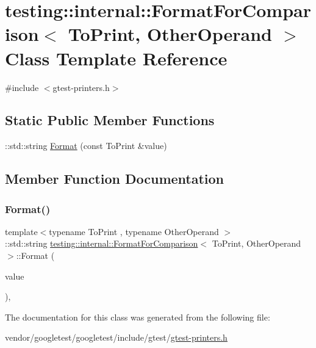 \hypertarget{classtesting_1_1internal_1_1_format_for_comparison}{}\section{testing\+:\+:internal\+:\+:Format\+For\+Comparison$<$ To\+Print, Other\+Operand $>$ Class Template Reference}
\label{classtesting_1_1internal_1_1_format_for_comparison}


{\ttfamily \#include $<$gtest-\/printers.\+h$>$}

\subsection*{Static Public Member Functions}
\begin{DoxyCompactItemize}
\item 
\+::std\+::string \hyperlink{classtesting_1_1internal_1_1_format_for_comparison_a2aeb688fc55b57abd3021d82eccad896}{Format} (const To\+Print \&value)
\end{DoxyCompactItemize}


\subsection{Member Function Documentation}
\mbox{\label{classtesting_1_1internal_1_1_format_for_comparison_a2aeb688fc55b57abd3021d82eccad896}} 
\subsubsection{\texorpdfstring{Format()}{Format()}}
{\footnotesize\ttfamily template$<$typename To\+Print , typename Other\+Operand $>$ \\
\+::std\+::string \hyperlink{classtesting_1_1internal_1_1_format_for_comparison}{testing\+::internal\+::\+Format\+For\+Comparison}$<$ To\+Print, Other\+Operand $>$\+::Format (\begin{DoxyParamCaption}\item[{const To\+Print \&}]{value }\end{DoxyParamCaption})\hspace{0.3cm}{\ttfamily [inline]}, {\ttfamily [static]}}



The documentation for this class was generated from the following file\+:\begin{DoxyCompactItemize}
\item 
vendor/googletest/googletest/include/gtest/\hyperlink{gtest-printers_8h}{gtest-\/printers.\+h}\end{DoxyCompactItemize}
